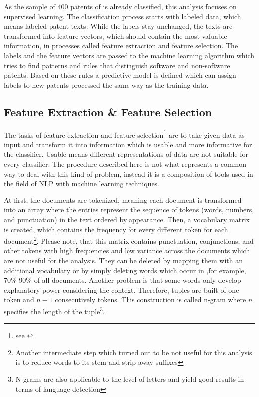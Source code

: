 \documentclass[12pt, a4paper, abstract, parskip]{scrartcl}
\theoremstyle{definition}
\begin{document}
As the sample of 400 patents of \citeauthor{bessen2007empirical} is already
classified, this analysis focuses on supervised learning. The classification
process starts with labeled data, which means labeled patent texts. While the
labels stay unchanged, the texts are transformed into feature vectors, which
should contain the most valuable information, in processes called feature
extraction and feature selection. The labels and the feature vectors are passed
to the machine learning algorithm which tries to find patterns and rules that
distinguish software and non-software patents. Based on these rules a
predictive model is defined which can assign labels to new patents processed
the same way as the training data.

\subsection{Feature Extraction \& Feature Selection} %
\label{ssub:feature_extraction_feature_selection}

The tasks of feature extraction and feature selection\footnote{see
\citet[chapter 6]{bird2009natural}} are to take given data as input and
transform it into information which is usable and more informative for the
classifier. Usable means different representations of data are not suitable for
every classifier. The procedure described here is not what represents a common
way to deal with this kind of problem, instead it is a composition of tools
used in the field of NLP with machine learning techniques.

At first, the documents are tokenized, meaning each document is transformed
into an array where the entries represent the sequence of tokens (words,
numbers, and punctuation) in the text ordered by appearance. Then, a vocabulary
matrix is created, which contains the frequency for every different token for
each document\footnote{Another intermediate step which turned out to be not
useful for this analysis is to reduce words to its stem and strip away
suffixes}. Please note, that this matrix contains punctuation, conjunctions,
and other tokens with high frequencies and low variance across the documents
which are not useful for the analysis. They can be deleted by mapping them with
an additional vocabulary or by simply deleting words which occur in ,for
example, 70\%-90\% of all documents. Another problem is that some words only
develop explanatory power considering the context. Therefore, tuples are built
of one token and $n-1$ consecutively tokens. This construction is called n-gram
where $n$ specifies the length of the tuple\footnote{N-grams are also
applicable to the level of letters and yield good results in terms of language
detection}.
\end{document}

